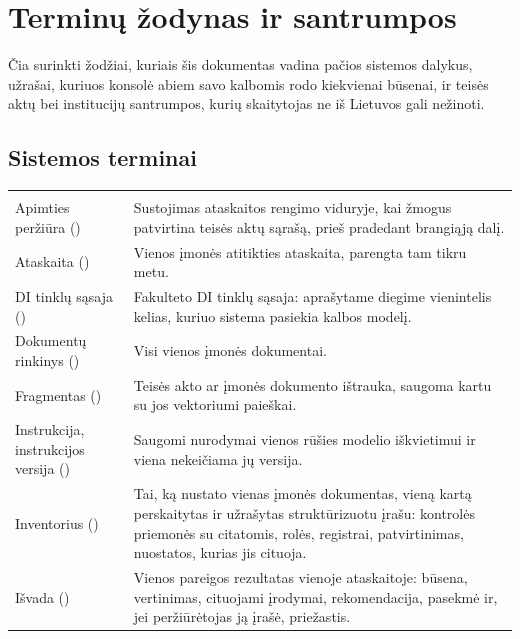 \chapter{Terminų žodynas ir santrumpos}\label{app:glossary}

Čia surinkti žodžiai, kuriais šis dokumentas vadina pačios sistemos dalykus, užrašai, kuriuos
konsolė abiem savo kalbomis rodo kiekvienai būsenai, ir teisės aktų bei institucijų santrumpos,
kurių skaitytojas ne iš Lietuvos gali nežinoti.

\section{Sistemos terminai}\label{sec:glossary:terms}

\begin{xltabular}{\textwidth}{@{}L{36mm}Y@{}}
\toprule
{} &  \\
\midrule
\endfirsthead
\toprule
{} &  \\
\midrule
\endhead
\bottomrule
\endlastfoot
Apimties peržiūra () & Sustojimas ataskaitos rengimo viduryje, kai žmogus
  patvirtina teisės aktų sąrašą, prieš pradedant brangiąją dalį. \\
Ataskaita () & Vienos įmonės atitikties ataskaita, parengta tam tikru metu. \\
DI tinklų sąsaja () & Fakulteto DI tinklų sąsaja: aprašytame diegime vienintelis
  kelias, kuriuo sistema pasiekia kalbos modelį. \\
Dokumentų rinkinys () & Visi vienos įmonės dokumentai. \\
Fragmentas () & Teisės akto ar įmonės dokumento ištrauka, saugoma kartu su jos
  vektoriumi paieškai. \\
Instrukcija, instrukcijos versija () & Saugomi nurodymai vienos rūšies
  modelio iškvietimui ir viena nekeičiama jų versija. \\
Inventorius () & Tai, ką nustato vienas įmonės dokumentas, vieną kartą perskaitytas
  ir užrašytas struktūrizuotu įrašu: kontrolės priemonės su citatomis, rolės, registrai, patvirtinimas,
  nuostatos, kurias jis cituoja. \\
Išvada () & Vienos pareigos rezultatas vienoje ataskaitoje: būsena, vertinimas,
  cituojami įrodymai, rekomendacija, pasekmė ir, jei peržiūrėtojas ją įrašė, priežastis. \\

\end{xltabular}
